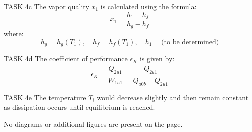 TASK 4c  
The vapor quality \( x_1 \) is calculated using the formula:  
\[
x_1 = \frac{h_1 - h_f}{h_g - h_f}
\]  
where:  
\[
h_g = h_g(T_1), \quad h_f = h_f(T_1), \quad h_1 = \text{(to be determined)}
\]  

TASK 4d  
The coefficient of performance \( \epsilon_K \) is given by:  
\[
\epsilon_K = \frac{\dot{Q}_{2u1}}{\dot{W}_{1u1}} = \frac{\dot{Q}_{2u1}}{\dot{Q}_{a0b} - \dot{Q}_{2u1}}
\]  

TASK 4e  
The temperature \( T_i \) would decrease slightly and then remain constant as dissipation occurs until equilibrium is reached.  

No diagrams or additional figures are present on the page.